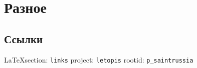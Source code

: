 \documentclass[a4paper,11pt]{book}
\makeatletter
\newcommand{\rindex}[2][\imki@jobname]{%
  \index[#1]{\detokenize{#2}}%
}
\makeatother
\begin{document}
 

\part{Разное}


 
 
  
\chapter{Ссылки}

\vspace{0.5cm}
{\small\LaTeX section: \verb|links| project: \verb|letopis| rootid: \verb|p_saintrussia|}
\vspace{0.5cm}
  
\end{document}
